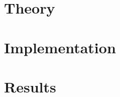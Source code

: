 \documentclass[oneside]{ctuthesis}
\theoremstyle{plain}
\theoremstyle{definition}
\theoremstyle{note}
\begin{document}
\maketitle



\part{Theory}




\part{Implementation}



\part{Results}



\appendix




\end{document}
